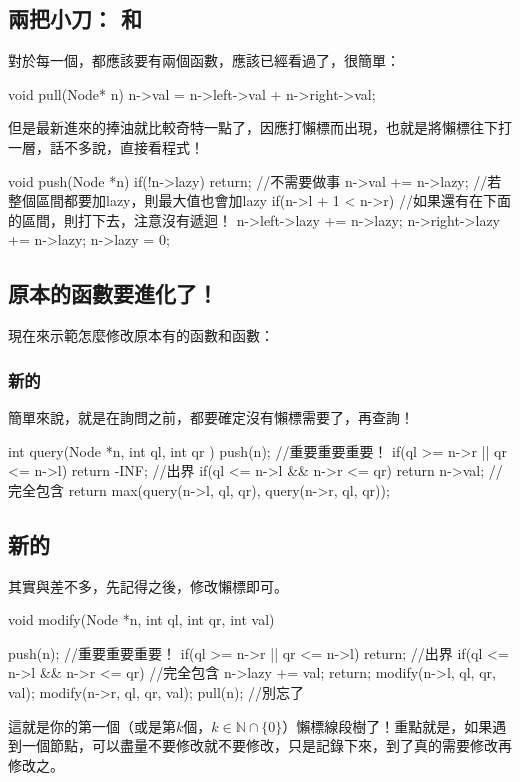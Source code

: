 \documentclass[main.tex]{subfiles}
\begin{document}
			\subsection{兩把小刀： 和 }
				對於每一個，都應該要有兩個函數，應該已經看過了，很簡單：
				\begin{C++}
void pull(Node* n){
	n->val = n->left->val + n->right->val;
}
				\end{C++}
				但是最新進來的捧油就比較奇特一點了，因應打懶標而出現，也就是將懶標往下打一層，話不多說，直接看程式！
				\begin{C++}
void push(Node *n){
	if(!n->lazy) return; //不需要做事
	n->val += n->lazy; //若整個區間都要加lazy，則最大值也會加lazy
	if(n->l + 1 < n->r){ //如果還有在下面的區間，則打下去，注意沒有遞迴！
		n->left->lazy += n->lazy;
		n->right->lazy += n->lazy;
	}
	n->lazy = 0;
}
				\end{C++}
	\subsection{原本的函數要進化了！}
		現在來示範怎麼修改原本有的函數和函數：
		\subsubsection{新的}
			簡單來說，就是在詢問之前，都要確定沒有懶標需要了，再查詢！
			\begin{C++}
int query(Node *n, int ql, int qr ){
	push(n); //重要重要重要！
	if(ql >= n->r || qr <= n->l) return -INF; //出界
	if(ql <= n->l && n->r <= qr) return n->val; //完全包含
	return max(query(n->l, ql, qr), query(n->r, ql, qr));
}
			\end{C++}
		\subsection{新的}
			其實與差不多，先記得之後，修改懶標即可。
			\begin{C++}
void modify(Node *n, int ql, int qr, int val){
	push(n); //重要重要重要！
	if(ql >= n->r || qr <= n->l) return; //出界
	if(ql <= n->l && n->r <= qr){ //完全包含
		n->lazy += val; 
		return;
	}
	modify(n->l, ql, qr, val); 
	modify(n->r, ql, qr, val);
	pull(n); //別忘了
	
}
			\end{C++}
		這就是你的第一個（或是第$k$個，$k \in \mathbb{N} \cap \{0\}$）懶標線段樹了！重點就是，如果遇到一個節點，可以盡量不要修改就不要修改，只是記錄下來，到了真的需要修改再修改之。
\end{document}
